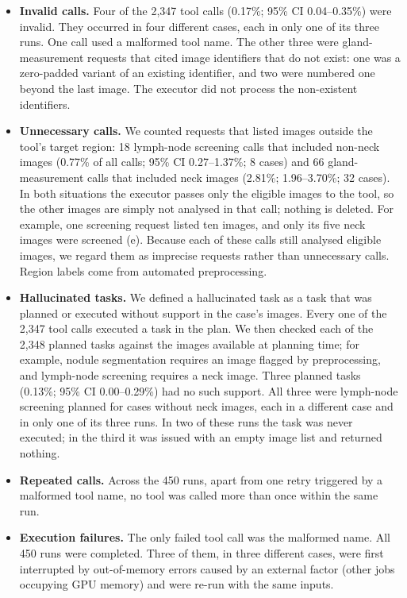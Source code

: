 \begin{itemize}[leftmargin=1.5em,itemsep=1pt,topsep=2pt]
\item \textbf{Invalid calls.} Four of the 2,347 tool calls (0.17\%; 95\% CI 0.04--0.35\%) were invalid. They occurred in four different cases, each in only one of its three runs. One call used a malformed tool name. The other three were gland-measurement requests that cited image identifiers that do not exist: one was a zero-padded variant of an existing identifier, and two were numbered one beyond the last image. The executor did not process the non-existent identifiers.
\item \textbf{Unnecessary calls.} We counted requests that listed images outside the tool's target region: 18 lymph-node screening calls that included non-neck images (0.77\% of all calls; 95\% CI 0.27--1.37\%; 8 cases) and 66 gland-measurement calls that included neck images (2.81\%; 1.96--3.70\%; 32 cases). In both situations the executor passes only the eligible images to the tool, so the other images are simply not analysed in that call; nothing is deleted. For example, one screening request listed ten images, and only its five neck images were screened (e). Because each of these calls still analysed eligible images, we regard them as imprecise requests rather than unnecessary calls. Region labels come from automated preprocessing.
\item \textbf{Hallucinated tasks.} We defined a hallucinated task as a task that was planned or executed without support in the case's images. Every one of the 2,347 tool calls executed a task in the plan. We then checked each of the 2,348 planned tasks against the images available at planning time; for example, nodule segmentation requires an image flagged by preprocessing, and lymph-node screening requires a neck image. Three planned tasks (0.13\%; 95\% CI 0.00--0.29\%) had no such support. All three were lymph-node screening planned for cases without neck images, each in a different case and in only one of its three runs. In two of these runs the task was never executed; in the third it was issued with an empty image list and returned nothing.
\item \textbf{Repeated calls.} Across the 450 runs, apart from one retry triggered by a malformed tool name, no tool was called more than once within the same run.
\item \textbf{Execution failures.} The only failed tool call was the malformed name. All 450 runs were completed. Three of them, in three different cases, were first interrupted by out-of-memory errors caused by an external factor (other jobs occupying GPU memory) and were re-run with the same inputs.

\end{itemize}
